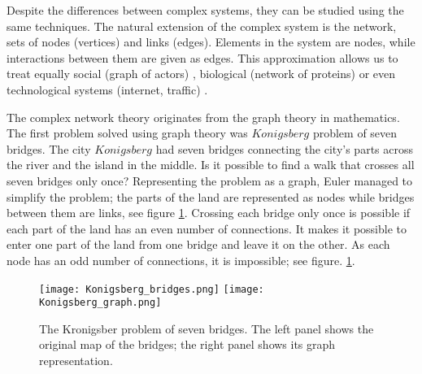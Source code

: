 Despite the differences between complex systems, they can be studied using the same techniques. The natural extension of the complex system is the network, sets of nodes (vertices) and links (edges). Elements in the system are nodes, while interactions between them are given as edges. This approximation allows us to treat equally social \cite{myers2014, sarigol2014} (graph of actors) , biological (network of proteins) \cite{fraiman2009ising, schneider2011modeling} or even technological systems (internet, traffic) \cite{costa2007characterization, costa2011analyzing, newman2003structure}. 

The complex network theory originates from the graph theory in mathematics. The first problem solved using graph theory was $Konigsberg$ problem of seven bridges. The city $Konigsberg$ had seven bridges connecting the city's parts across the river and the island in the middle. Is it possible to find a walk that crosses all seven bridges only once? Representing the problem as a graph, Euler managed to simplify the problem; the parts of the land are represented as nodes while bridges between them are links, see figure \ref{fig:Krgraph}. Crossing each bridge only once is possible if each part of the land has an even number of connections. It makes it possible to enter one part of the land from one bridge and leave it on the other. As each node has an odd number of connections, it is impossible; see figure. \ref{fig:Krgraph}.

\begin{figure}[!ht]
	\centering
	\texttt{[image: Konigsberg\_bridges.png]} \hspace{2cm}
	\texttt{[image: Konigsberg\_graph.png]}
	\caption[Konigsberg problem of seven bridges.]{The Kronigsber problem of seven bridges. The left panel shows the original map of the bridges; the right panel shows its graph representation. }

	\label{fig:Krgraph}
\end{figure}

